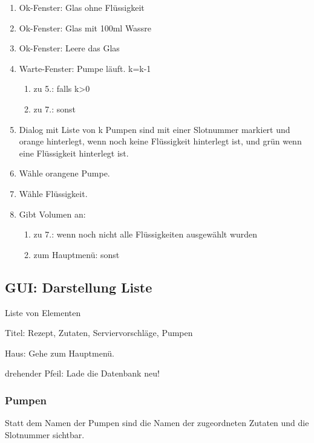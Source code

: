 {\begin{enumerate}
	\item Ok-Fenster: Glas ohne Flüssigkeit
	
    \item Ok-Fenster: Glas mit 100ml Wassre
	
	\item Ok-Fenster: Leere das Glas
	
	\item Warte-Fenster: Pumpe läuft. k=k-1

\begin{enumerate}
		\item zu 5.: falls k>0
		
		\item zu 7.: sonst

\end{enumerate}
\item Dialog mit Liste von k Pumpen sind mit einer Slotnummer markiert und orange hinterlegt, wenn noch keine Flüssigkeit hinterlegt ist, und grün wenn eine Flüssigkeit hinterlegt ist.

\item Wähle orangene Pumpe.

\item Wähle Flüssigkeit.

\item Gibt Volumen an:
\begin{enumerate}

\item zu 7.: wenn noch nicht alle Flüssigkeiten ausgewählt wurden

\item zum Hauptmenü: sonst
\end{enumerate}
\end{enumerate}


\subsection{GUI: Darstellung Liste}
Liste von Elementen

Titel: Rezept, Zutaten, Serviervorschläge, Pumpen

Haus: Gehe zum Hauptmenü.

drehender Pfeil: Lade die Datenbank neu!

\subsubsection{Pumpen}

Statt dem Namen der Pumpen sind die Namen der zugeordneten Zutaten und die Slotnummer sichtbar.

}
